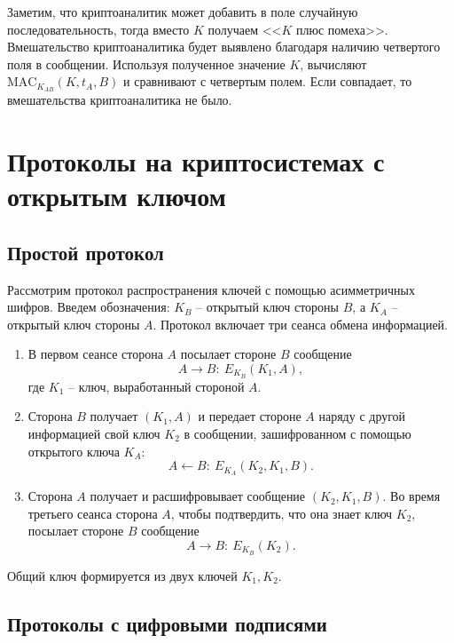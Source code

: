\documentclass[10pt,a4paper]{book}
\newcommand{\MAC}{\textrm{MAC}}
\begin{document}
Заметим, что криптоаналитик может добавить в поле случайную последовательность, тогда вместо $K$ получаем <<$K$ плюс помеха>>. Вмешательство криптоаналитика будет выявлено благодаря наличию четвертого поля в сообщении. Используя полученное значение $K$, вычисляют $\MAC_{K_{AB}}(K, t_A, B)$ и сравнивают с четвертым полем. Если совпадает, то вмешательства криптоаналитика не было.



\section{Протоколы на криптосистемах с открытым ключом}

\subsection{Простой протокол}

Рассмотрим протокол распространения ключей с помощью асимметричных шифров. Введем обозначения: $K_B$ -- открытый ключ стороны $B$, а $K_A$ -- открытый ключ стороны $A$. Протокол включает три сеанса обмена информацией.
\begin{enumerate}
    \item В первом сеансе сторона $A$ посылает стороне $B$ сообщение
            \[ A \rightarrow B: ~ E_{K_B}(K_1, A), \]
        где $K_1$ -- ключ, выработанный стороной $A$.
    \item Сторона $B$ получает $(K_1, A)$ и передает стороне $A$ наряду с другой информацией свой ключ $K_2$ в сообщении, зашифрованном с помощью открытого ключа $K_A$:
            \[ A \leftarrow B: ~ E_{K_A}(K_2, K_1, B). \]
    \item Сторона $A$ получает и расшифровывает сообщение $(K_2, K_1, B)$. Во время третьего сеанса  сторона $A$, чтобы подтвердить, что она знает ключ $K_2$, посылает стороне $B$ сообщение
            \[ A \rightarrow B: ~ E_{K_B}(K_2). \]
\end{enumerate}
Общий ключ формируется из двух ключей $K_1, K_2$.

\subsection{Протоколы с цифровыми подписями}
\end{document}
